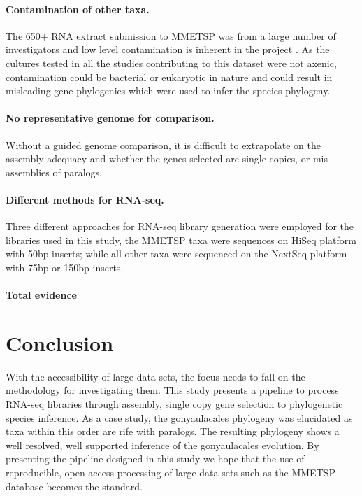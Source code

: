 \documentclass[12pt]{article}
\begin{document}
\paragraph*{Contamination of other taxa.} 
The 650+ RNA extract submission to MMETSP was from a large number of investigators and low level contamination is inherent in the project \cite{keeling2014marine}. 
As the cultures tested in all the studies contributing to this dataset were not axenic, contamination could be bacterial or eukaryotic in nature and could result in misleading gene phylogenies which were used to infer the species phylogeny.
\paragraph*{No representative genome for comparison.} 
Without a guided genome comparison, it is difficult to extrapolate on the assembly adequacy and whether the genes selected are single copies, or  mis-assemblies of paralogs.
\paragraph*{Different methods for RNA-seq.} 
Three different approaches for RNA-seq library generation were employed for the libraries used in this study, the MMETSP taxa were sequences on HiSeq platform with 50bp inserts; while all other taxa were sequenced on the NextSeq platform with 75bp or 150bp inserts.
\paragraph*{Total evidence}

\newpage
\section{Conclusion}
With the accessibility of large data sets, the focus needs to fall on the methodology for investigating them. This study presents a pipeline to process RNA-seq libraries through assembly, single copy gene selection to phylogenetic species inference. As a case study, the gonyaulacales phylogeny was elucidated as taxa within this order are rife with paralogs. The resulting phylogeny shows a well resolved, well supported inference of the gonyaulacales evolution. By presenting the pipeline designed in this study we hope that the use of reproducible, open-access processing of large data-sets such as the MMETSP database becomes the standard.  
\newpage
\end{document}
